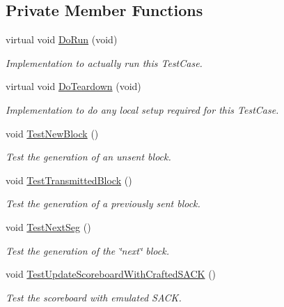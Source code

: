 \subsection*{Private Member Functions}
\begin{DoxyCompactItemize}
\item 
virtual void \hyperlink{classTcpTxBufferTestCase_a004312af9ed95478a651632f8e5a7181}{Do\+Run} (void)
\begin{DoxyCompactList}\small\item\em Implementation to actually run this Test\+Case. \end{DoxyCompactList}\item 
virtual void \hyperlink{classTcpTxBufferTestCase_a5a55b6f1bc9b85f091dd7c9a10fbc1bb}{Do\+Teardown} (void)
\begin{DoxyCompactList}\small\item\em Implementation to do any local setup required for this Test\+Case. \end{DoxyCompactList}\item 
void \hyperlink{classTcpTxBufferTestCase_a2b058225bf6a55a7e80bca5d1dc93f7a}{Test\+New\+Block} ()
\begin{DoxyCompactList}\small\item\em Test the generation of an unsent block. \end{DoxyCompactList}\item 
void \hyperlink{classTcpTxBufferTestCase_a088069951796a97ab17f7a6a9996034d}{Test\+Transmitted\+Block} ()
\begin{DoxyCompactList}\small\item\em Test the generation of a previously sent block. \end{DoxyCompactList}\item 
void \hyperlink{classTcpTxBufferTestCase_a87a6f679a0da25966b57cd415b03a268}{Test\+Next\+Seg} ()
\begin{DoxyCompactList}\small\item\em Test the generation of the \char`\"{}next\char`\"{} block. \end{DoxyCompactList}\item 
void \hyperlink{classTcpTxBufferTestCase_ad18852b35db54711dd66d6738a9e5604}{Test\+Update\+Scoreboard\+With\+Crafted\+S\+A\+CK} ()
\begin{DoxyCompactList}\small\item\em Test the scoreboard with emulated S\+A\+CK. \end{DoxyCompactList}\end{DoxyCompactItemize}
